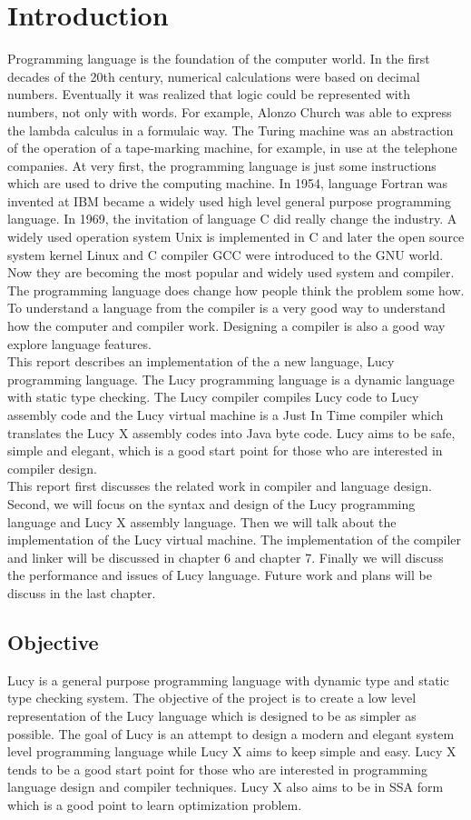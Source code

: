 \chapter{Introduction}
Programming language is the foundation of the computer world. In the first decades of the 20th century, numerical calculations were based on decimal numbers. Eventually it was realized that logic could be represented with numbers, not only with words. For example, Alonzo Church was able to express the lambda calculus in a formulaic way. The Turing machine was an abstraction of the operation of a tape-marking machine, for example, in use at the telephone companies. At very first, the programming language is just some instructions which are used to drive the computing machine. In 1954, language Fortran was invented at IBM became a widely used high level general purpose programming language. In 1969, the invitation of language C did really change the industry. A widely used operation system Unix is implemented in C and later the open source system kernel Linux and C compiler GCC were introduced to the GNU world. Now they are becoming the most popular and widely used system and compiler. \\
The programming language does change how people think the problem some how. To understand a language from the compiler is a very good way to understand how the computer and compiler work. Designing a compiler is also a good way explore language features. \\
This report describes an implementation of the a new language, Lucy programming language. The Lucy programming language is a dynamic language with static type checking. The Lucy compiler compiles Lucy code to Lucy assembly code and the Lucy virtual machine is a Just In Time compiler which translates the Lucy X assembly codes into Java byte code. Lucy aims to be safe, simple and elegant, which is a good start point for those who are interested in compiler design. \\
This report first discusses the related work in compiler and language design. Second, we will focus on the syntax and design of the Lucy programming language and Lucy X assembly language. Then we will talk about the implementation of the Lucy virtual machine. The implementation of the compiler and linker will be discussed in chapter 6 and chapter 7. Finally we will discuss the performance and issues of Lucy language. Future work and plans will be discuss in the last chapter.


\section{Objective}
Lucy is a general purpose programming language with dynamic type and static type checking system. The objective of the project is to create a low level representation of the Lucy language which is designed to be as simpler as possible. The goal of Lucy is an attempt to design a modern and elegant system level programming language while Lucy X aims to keep simple and easy. Lucy X tends to be a good start point for those who are interested in programming language design and compiler techniques. Lucy X also aims to be in SSA form which is a good point to learn optimization problem.


